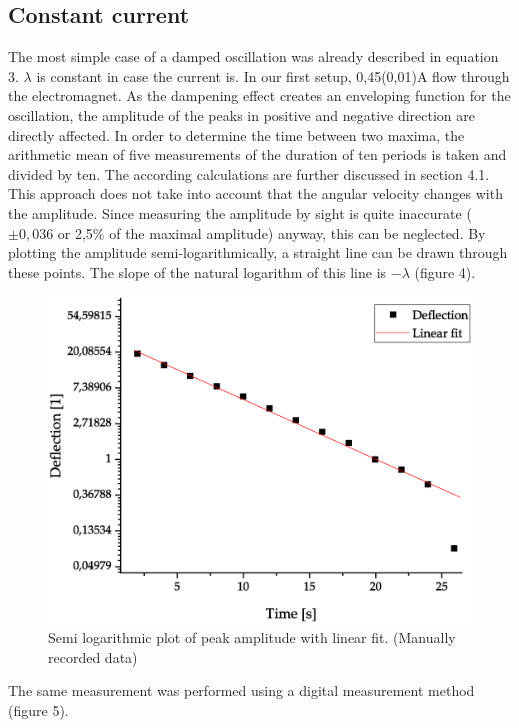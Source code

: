 \documentclass{article}
\begin{document}
\subsection{Constant current}
The most simple case of a damped oscillation was already described in equation 3.
$\lambda$ is constant in case the current is.
In our first setup, 0,45(0,01)A flow through the electromagnet.
As the dampening effect creates an enveloping function for the oscillation, the amplitude of the peaks in positive and negative direction are directly affected.
In order to determine the time between two maxima, the arithmetic mean of five measurements of the duration of ten periods is taken and divided by ten.
The according calculations are further discussed in section 4.1.
This approach does not take into account that the angular velocity changes with the amplitude.
Since measuring the amplitude by sight is quite inaccurate ($\pm 0,036$ or 2,5$\%$ of the maximal amplitude) anyway, this can be neglected.
By plotting the amplitude semi-logarithmically, a straight line can be drawn through these points.
The slope of the natural logarithm of this line is $-\lambda$ (figure 4).
\begin{figure}[hbt!]
\centering
\includegraphics[width=400pt]{manualPlot.eps}
\caption{Semi logarithmic plot of peak amplitude with linear fit. (Manually recorded data)}
\label{fig:length_eight_mouse}
\end{figure}
The same measurement was performed using a digital measurement method (figure 5).
\end{document}
